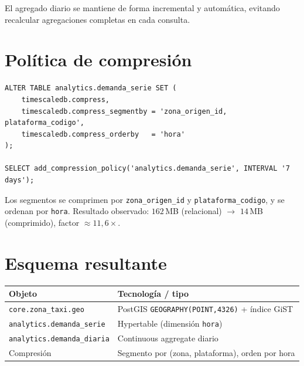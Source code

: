 \documentclass[11pt,a4paper]{article}
\begin{document}
El agregado diario se mantiene de forma incremental y automática, evitando recalcular
agregaciones completas en cada consulta.

\section{Política de compresión}

\begin{lstlisting}
ALTER TABLE analytics.demanda_serie SET (
    timescaledb.compress,
    timescaledb.compress_segmentby = 'zona_origen_id, plataforma_codigo',
    timescaledb.compress_orderby   = 'hora'
);

SELECT add_compression_policy('analytics.demanda_serie', INTERVAL '7 days');
\end{lstlisting}

Los segmentos se comprimen por \texttt{zona\_origen\_id} y \texttt{plataforma\_codigo}, y se
ordenan por \texttt{hora}. Resultado observado: $162$\,MB (relacional) $\to$ $14$\,MB
(comprimido), factor $\approx 11{,}6\times$.

\section{Esquema resultante}

\begin{center}
\begin{tabular}{@{}ll@{}}
\toprule
\textbf{Objeto} & \textbf{Tecnología / tipo} \\
\midrule
\texttt{core.zona\_taxi.geo} & PostGIS \texttt{GEOGRAPHY(POINT,4326)} + índice GiST \\
\texttt{analytics.demanda\_serie} & Hypertable (dimensión \texttt{hora}) \\
\texttt{analytics.demanda\_diaria} & Continuous aggregate diario \\
Compresión & Segmento por (zona, plataforma), orden por hora \\
\bottomrule
\end{tabular}
\end{center}
\end{document}
